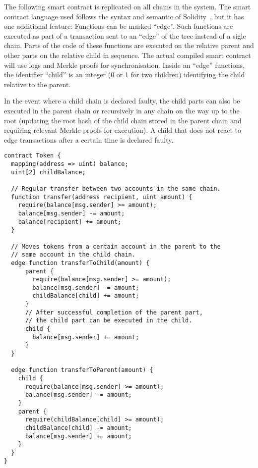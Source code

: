 \documentclass[11pt,letterpaper]{article}
\newtheorem{property}[dummytheorem]{Property}
\begin{document}



The following smart contract is replicated on all chains in
the system. The smart contract language used follows
the syntax and semantic of Solidity~\cite{solidity}, but it has
one additional feature: Functions can be marked ``edge''.
Such functions
are executed as part of a transaction sent to an ``edge''
of the tree instead of a sigle chain. Parts of the code of these functions
are executed on the relative parent and other parts on
the relative child in sequence. The actual compiled smart contract
will use logs and Merkle proofs for synchronisation.
Inside an ``edge'' functions, the identifier
``child'' is an integer (0 or 1 for two children) identifying the
child relative to the parent.

In the event where a child chain is declared faulty, the child
parts can also be executed in the parent chain or recursively
in any chain on the way up to the root (updating the
root hash of the child chain stored in the parent chain and requiring
relevant Merkle proofs for execution). A child that does not react to
edge transactions after a certain time is declared faulty.

\begin{lstlisting}
contract Token {
  mapping(address => uint) balance;
  uint[2] childBalance;

  // Regular transfer between two accounts in the same chain.
  function transfer(address recipient, uint amount) {
    require(balance[msg.sender] >= amount);
    balance[msg.sender] -= amount;
    balance[recipient] += amount;
  }

  // Moves tokens from a certain account in the parent to the
  // same account in the child chain.
  edge function transferToChild(amount) {
      parent {
        require(balance[msg.sender] >= amount);
        balance[msg.sender] -= amount;
        childBalance[child] += amount;
      }
      // After successful completion of the parent part,
      // the child part can be executed in the child.
      child {
        balance[msg.sender] += amount;
      }
  }

  edge function transferToParent(amount) {
    child {
      require(balance[msg.sender] >= amount);
      balance[msg.sender] -= amount;
    }
    parent {
      require(childBalance[child] >= amount);
      childBalance[child] -= amount;
      balance[msg.sender] += amount;
    }
  }
}
\end{lstlisting}
\end{document}
